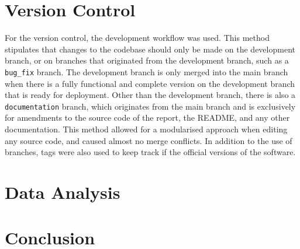 \documentclass[12pt]{article}
\begin{document}
\section{Version Control}
For the version control, the development workflow was used. This method
stipulates that changes to the codebase should only be made on the development
branch, or on branches that originated from the development branch, such as a
\verb|bug_fix| branch. The development branch is only merged into the main
branch when there is a fully functional and complete version on the development
branch that is ready for deployment.\newline\newline
Other than the development branch, there is also a \verb|documentation| branch,
which originates from the main branch and is exclusively for amendments to the
source code of the report, the README, and any other
documentation.\newline\newline
This method allowed for a modularised approach when editing any source code, and
caused almost no merge conflicts. In addition to the use of branches, tags were
also used to keep track if the official versions of the software.

\section{Data Analysis}

\section{Conclusion}
\end{document}
